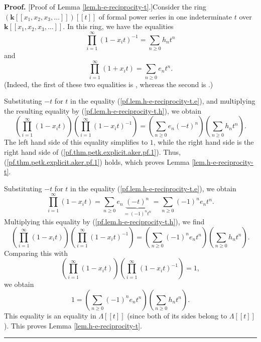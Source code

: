 \documentclass[numbers=enddot,12pt,final,onecolumn,notitlepage]{scrartcl}%
\theoremstyle{definition}
\newenvironment{proof}[1][Proof]{\noindent\textbf{#1.} }{\ \rule{0.5em}{0.5em}}
\let\sumnonlimits\sum
\let\prodnonlimits\prod
\renewcommand{\sum}{\sumnonlimits\limits}
\renewcommand{\prod}{\prodnonlimits\limits}
\newenvironment{verlong}{}{}
\newenvironment{vershort}{}{}
\begin{document}
\begin{proof}
[Proof of Lemma \ref{lem.h-e-reciprocity-t}.]Consider the ring $\left(
\mathbf{k}\left[  \left[  x_{1},x_{2},x_{3},\ldots\right]  \right]  \right)
\left[  \left[  t\right]  \right]  $ of formal power series in one
indeterminate $t$ over $\mathbf{k}\left[  \left[  x_{1},x_{2},x_{3}%
,\ldots\right]  \right]  $. In this ring, we have the equalities%
\begin{equation}
\prod_{i=1}^{\infty}\left(  1-x_{i}t\right)  ^{-1}=\sum_{n\geq0}h_{n}t^{n}
\label{pf.lem.h-e-reciprocity-t.h}%
\end{equation}
and%
\begin{equation}
\prod_{i=1}^{\infty}\left(  1+x_{i}t\right)  =\sum_{n\geq0}e_{n}t^{n}.
\label{pf.lem.h-e-reciprocity-t.e}%
\end{equation}
(Indeed, the first of these two equalities is \cite[(2.2.18)]{GriRei}, whereas
the second is \cite[(2.2.19)]{GriRei}.)

\begin{vershort}
Substituting $-t$ for $t$ in the equality (\ref{pf.lem.h-e-reciprocity-t.e}),
and multiplying the resulting equality by (\ref{pf.lem.h-e-reciprocity-t.h}),
we obtain%
\[
\left(  \prod_{i=1}^{\infty}\left(  1-x_{i}t\right)  \right)  \left(
\prod_{i=1}^{\infty}\left(  1-x_{i}t\right)  ^{-1}\right)  =\left(
\sum_{n\geq0}e_{n}\left(  -t\right)  ^{n}\right)  \left(  \sum_{n\geq0}%
h_{n}t^{n}\right)  .
\]
The left hand side of this equality simplifies to $1$, while the right hand
side is the right hand side of (\ref{pf.thm.petk.explicit.aker.pf.1}). Thus,
(\ref{pf.thm.petk.explicit.aker.pf.1}) holds, which proves Lemma
\ref{lem.h-e-reciprocity-t}.
\end{vershort}

\begin{verlong}
Substituting $-t$ for $t$ in the equality (\ref{pf.lem.h-e-reciprocity-t.e}),
we obtain%
\[
\prod_{i=1}^{\infty}\left(  1-x_{i}t\right)  =\sum_{n\geq0}e_{n}%
\underbrace{\left(  -t\right)  ^{n}}_{=\left(  -1\right)  ^{n}t^{n}}%
=\sum_{n\geq0}\left(  -1\right)  ^{n}e_{n}t^{n}.
\]
Multiplying this equality by (\ref{pf.lem.h-e-reciprocity-t.h}), we find%
\[
\left(  \prod_{i=1}^{\infty}\left(  1-x_{i}t\right)  \right)  \left(
\prod_{i=1}^{\infty}\left(  1-x_{i}t\right)  ^{-1}\right)  =\left(
\sum_{n\geq0}\left(  -1\right)  ^{n}e_{n}t^{n}\right)  \left(  \sum_{n\geq
0}h_{n}t^{n}\right)  .
\]
Comparing this with%
\[
\left(  \prod_{i=1}^{\infty}\left(  1-x_{i}t\right)  \right)  \left(
\prod_{i=1}^{\infty}\left(  1-x_{i}t\right)  ^{-1}\right)  =1,
\]
we obtain%
\[
1=\left(  \sum_{n\geq0}\left(  -1\right)  ^{n}e_{n}t^{n}\right)  \left(
\sum_{n\geq0}h_{n}t^{n}\right)  .
\]
This equality is an equality in $\Lambda\left[  \left[  t\right]  \right]  $
(since both of its sides belong to $\Lambda\left[  \left[  t\right]  \right]
$). This proves Lemma \ref{lem.h-e-reciprocity-t}.
\end{verlong}
\end{proof}
\end{document}
